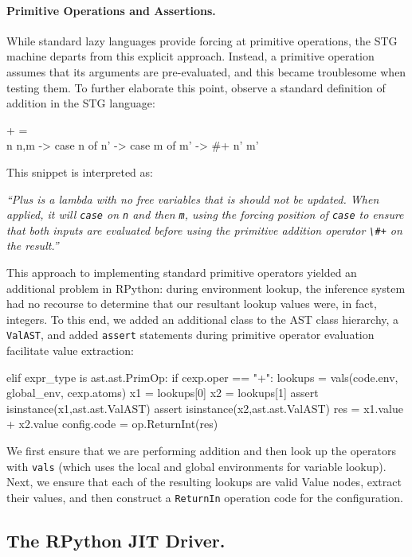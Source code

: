 \documentclass[preprint]{sigplanconf}
\begin{document}
\paragraph{Primitive Operations and Assertions.}
While standard lazy languages provide forcing at primitive operations, the
STG machine departs from this explicit approach. Instead, a primitive operation
assumes that its arguments are pre-evaluated, and this became troublesome when
testing them. To further elaborate this point, observe a standard definition
of addition in the STG language:
\begin{code}[language=Haskell]
+ = \ {} \\n {n,m} -> case n of
                        n' -> case m of
                                m' -> #+ n' m'
\end{code}
This snippet is interpreted as: 
\begin{center}
\emph{
``Plus is a lambda with no free variables that
is should not be updated. When applied, it will \lstinline{case} on
\lstinline{n} and then \lstinline{m}, using the forcing position of
\lstinline{case} to ensure that both inputs are evaluated before using the
primitive addition operator \lstinline{\#+} on the result.''
}
\end{center}
This approach to implementing standard primitive operators yielded an
additional problem in RPython: during environment lookup, the
inference system had no recourse to determine that our resultant lookup
values were, in fact, integers. To this end, we added an additional
class to the AST class hierarchy, a \lstinline{ValAST}, and added
\lstinline{assert} statements during primitive operator evaluation
facilitate value extraction:
\begin{code}
elif expr_type is ast.ast.PrimOp:
  if cexp.oper == "+":
    lookups = vals(code.env,
                   global_env, 
                   cexp.atoms)
    x1     = lookups[0]
    x2     = lookups[1]
    assert isinstance(x1,ast.ast.ValAST)
    assert isinstance(x2,ast.ast.ValAST)
    res    = x1.value + x2.value
    config.code = op.ReturnInt(res) 
\end{code}
We first ensure that we are performing addition and then look up the operators
with \lstinline{vals} (which uses the local and global environments for variable
lookup). Next, we ensure that each of the resulting lookups are valid Value
nodes, extract their values, and then construct a \lstinline{ReturnIn} operation
code for the configuration.

\subsection{The RPython JIT Driver.}
\end{document}
